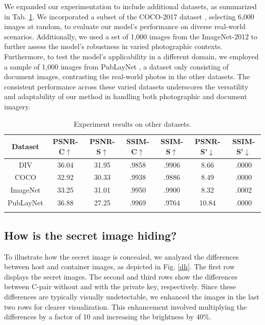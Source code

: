 \documentclass{article}
\begin{document}
We expanded our experimentation to include additional datasets, as summarized in Tab. \ref{dataset}. We incorporated a subset of the COCO-2017 dataset \cite{cocodataset}, selecting 6,000 images at random, to evaluate our model's performance on diverse real-world scenarios. Additionally, we used a set of 1,000 images from the ImageNet-2012 \cite{ILSVRC15} to further assess the model's robustness in varied photographic contexts. Furthermore, to test the model's applicability in a different domain, we employed a sample of 1,000 images from PubLayNet \cite{zhong2019publaynet}, a dataset only consisting of document images, contrasting the real-world photos in the other datasets. The consistent performance across these varied datasets underscores the versatility and adaptability of our method in handling both photographic and document imagery.
\begin{table}[!h]
	\centering
	\caption{Experiment results on other datasets.}
	\begin{tabular}{ccccccc}
		\toprule
		Dataset &  PSNR-C$\uparrow$ & PSNR-S$\uparrow$ & SSIM-C$\uparrow$  & SSIM-S$\uparrow$ & PSNR-S'$\downarrow$ & SSIM-S'$\downarrow$           \\ \midrule
		DIV & 36.04 & 31.95 & .9858 & .9906 & 8.66 & .0000 \\
		COCO & 32.92 & 30.33 & .9938 & .9886  &8.49 & .0000\\
		ImageNet & 33.25 & 31.01 & .9950 & .9900 & 8.32 & .0002 \\
		PubLayNet & 36.88 & 27.25 & .9969 &.9764 & 10.84 & .0000 \\
		\bottomrule
		\label{dataset}
	\end{tabular}
\end{table}

\subsection{How is the secret image hiding?}
To illustrate how the secret image is concealed, we analyzed the differences between host and container images, as depicted in Fig. \ref{dh}. The first row displays the secret images. The second and third rows show the differences between C-pair without and with the private key, respectively. Since these differences are typically visually undetectable, we enhanced the images in the last two rows for clearer visualization. This enhancement involved multiplying the differences by a factor of 10 and increasing the brightness by 40\%.
\end{document}
